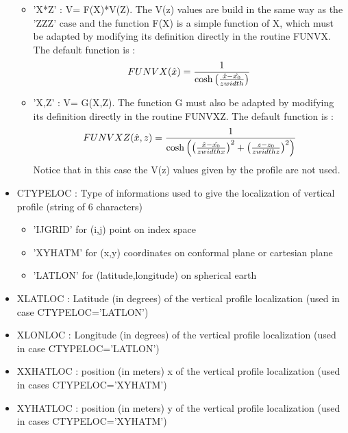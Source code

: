 \begin{itemize}
\begin{itemize}
\item 
'X*Z'    : V= F(X)*V(Z).  
The V(z) values are build in the same way as the
'ZZZ' case and the function F(X) is a simple function of X, which must be
adapted by modifying its definition directly in the routine FUNVX. The default
 function is :
$$  FUNVX(\hat{x}) = { 1 \over \cosh \left( 
   { \hat{x} - \hat{x_0} \over zwidth } \right) } $$

\item
 'X,Z'    : V= G(X,Z).  
The function  G must also be adapted  by modifying its definition directly in the
 routine FUNVXZ. The default function is :
$$  FUNVXZ(\hat{x},z) = { 1 \over \cosh \left( 
  \left( { \hat{x} - \hat{x_0} \over zwidthx } \right) ^2 +
  \left( { z - z_0 \over zwidthz } \right) ^2 
 \right) } $$
Notice that in this case the V(z) values given by the profile are not used.
\end{itemize}


\item 
CTYPELOC  : Type of informations  used to give the
                    localization of vertical profile (string of 6 characters)
\begin{itemize}
\item
  'IJGRID'  for (i,j) point  on index space
\item
 'XYHATM' for (x,y) coordinates on
conformal plane or cartesian plane
\item
 'LATLON' for (latitude,longitude) on   spherical earth  
\end{itemize}


\item XLATLOC : Latitude (in degrees) of the vertical
                profile localization  (used in case  CTYPELOC='LATLON') 


\item
 XLONLOC : Longitude (in degrees) of the vertical
                profile localization  (used in case  CTYPELOC='LATLON') 

\item
   XXHATLOC : position (in meters) x of the vertical profile
                    localization  (used in cases 
                                         CTYPELOC='XYHATM') 


\item
 XYHATLOC :  position (in meters) y of the vertical profile
                    localization  (used in cases 
                                         CTYPELOC='XYHATM') 


\end{itemize}
